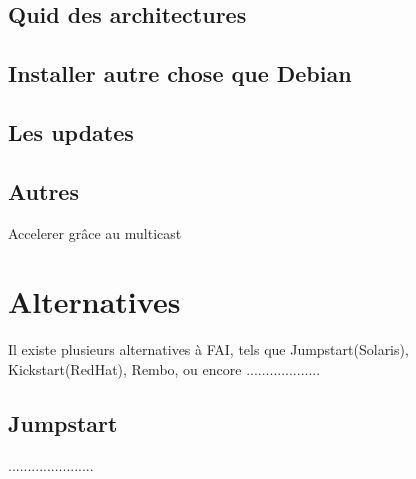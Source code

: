 \documentclass[a4paper,12pt,one side,titlepage]{report}
\begin{document}
\section{Quid des architectures}

\section{Installer autre chose que Debian}

\section{Les updates}

\section{Autres}
    Accelerer grâce au multicast

\chapter{Alternatives}
Il existe plusieurs alternatives à FAI, tels que Jumpstart(Solaris), Kickstart(RedHat), Rembo, ou encore ...................

\section{Jumpstart}
......................
\end{document}
